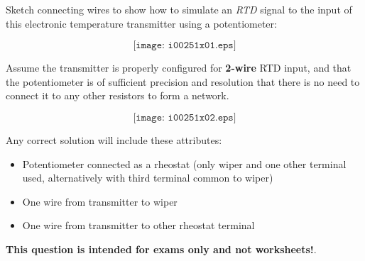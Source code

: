 

Sketch connecting wires to show how to simulate an {\it RTD} signal to the input of this electronic temperature transmitter using a potentiometer:

$$\texttt{[image: i00251x01.eps]}$$

Assume the transmitter is properly configured for {\bf 2-wire} RTD input, and that the potentiometer is of sufficient precision and resolution that there is no need to connect it to any other resistors to form a network.







$$\texttt{[image: i00251x02.eps]}$$

Any correct solution will include these attributes:

\begin{itemize}
\item{} Potentiometer connected as a rheostat (only wiper and one other terminal used, alternatively with third terminal common to wiper)
\item{} One wire from transmitter to wiper
\item{} One wire from transmitter to other rheostat terminal
\end{itemize}







{\bf This question is intended for exams only and not worksheets!}.



